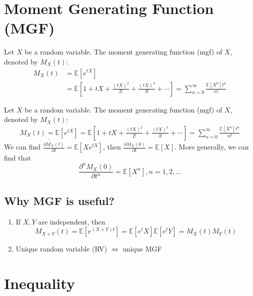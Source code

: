 \documentclass[11pt]{elegantbook}
\begin{document}
\section{Moment Generating Function (MGF)}
\begin{definition}
    Let $X$ be a random variable. The moment generating function (mgf) of $X$, denoted by $M_X(t)$:
    \begin{equation}
        \begin{aligned}
            M_X(t)&=\mathbb{E}[e^{tX}]\\&=\mathbb{E}\left[1+tX+\frac{(tX)^2}{2!}+\frac{(tX)^3}{3!}+\cdots\right]=\sum_{n=0}^\infty\frac{\mathbb{E}[X^n]t^n}{n!}
        \end{aligned}
        \nonumber
    \end{equation}
\end{definition}
Let $X$ be a random variable. The moment generating function (mgf) of $X$, denoted by $M_X(t)$:
\begin{equation}
    \begin{aligned}
        \underline{M_X(t)=\mathbb{E}[e^{tX}]}=\mathbb{E}\left[1+tX+\frac{(tX)^2}{2!}+\frac{(tX)^3}{3!}+\cdots\right]=\sum_{n=0}^\infty\frac{\mathbb{E}[X^n]t^n}{n!}
    \end{aligned}
    \nonumber
\end{equation}
We can find $\frac{\partial M_X(t)}{\partial t}= \mathbb{E}\left[Xe^{tX}\right]$, then $\frac{\partial M_X(0)}{\partial t}= \mathbb{E}\left[X\right]$. More generally, we can find that $$\frac{\partial^n M_X(0)}{\partial t^n}= \mathbb{E}\left[X^n\right],n=1,2,...$$
\subsection*{Why MGF is useful?}
\begin{enumerate}[(1)]
    \item If $X,Y$ are independent, then $$M_{X+Y}(t)=\mathbb{E}[e^{(X+Y)t}]=\mathbb{E}[e^tX]\mathbb{E}[e^tY]=M_X(t)M_Y(t)$$
    \item Unique random variable (RV) $\Leftrightarrow$ unique MGF
\end{enumerate}

\section{Inequality}
\end{document}
